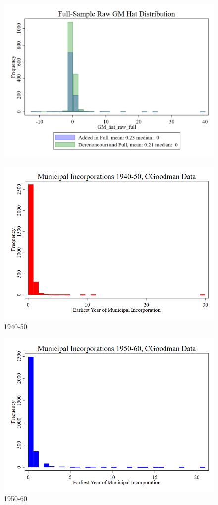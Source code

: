 \documentclass{article}
\begin{document}
\clearpage
\begin{figure}
	\centering
	\includegraphics[width=.8\textwidth]{figures/distributions/GM_hat_raw_full.png}
\end{figure}
\clearpage
\begin{figure}
	\centering
	\includegraphics[width=.8\textwidth]{figures/distributions/cgoodman_1940.png}
	\caption{1940-50}
\end{figure}
\clearpage
\begin{figure}
	\centering
	\includegraphics[width=.8\textwidth]{figures/distributions/cgoodman_1950.png}
	\caption{1950-60}
\end{figure}
\end{document}
